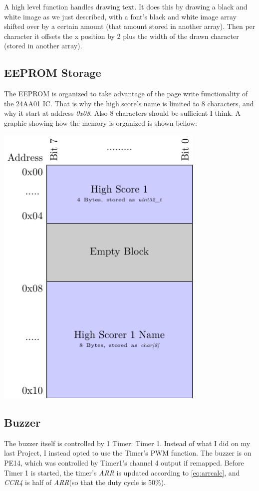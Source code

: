 \documentclass[12pt, a4paper]{article}
\newenvironment{Figure}
  {\par\medskip\noindent\minipage{\linewidth}\centering}
  {\endminipage\par\medskip}
\begin{document}
    A high level function handles drawing text. It does this by drawing a black and white image as we just described, with a font's black and white image array shifted over by a certain amount (that amount stored in another array). Then per character it offsets the x position by 2 plus the width of the drawn character (stored in another array).
    \subsection{EEPROM Storage}
    The EEPROM is organized to take advantage of the page write functionality of the 24AA01 IC. That is why the high score's name is limited to 8 characters, and why it start at address \textit{0x08}. Also 8 characters should be sufficient I think. A graphic showing how the memory is organized is shown bellow:
    \begin{Figure}\centering\includegraphics[width=0.75\textwidth]{TikzDrawings/eeprom.pdf}\end{Figure}
    \subsection{Buzzer}
    The buzzer itself is controlled by 1 Timer: Timer 1. Instead of what I did on my last Project, I instead opted to use the Timer's PWM function. The buzzer is on PE14, which was controlled by Timer1's channel 4 output if remapped. Before Timer 1 is started, the timer's \textit{ARR} is updated according to \cref{eq:arrcalc}, and \textit{CCR4} is half of \textit{ARR}(so that the duty cycle is 50\%).
    
\end{document}

